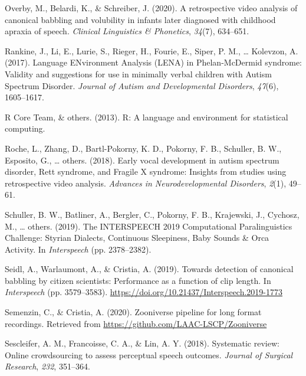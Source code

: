 \documentclass[english,,man]{apa6}
\begin{document}
\leavevmode\hypertarget{ref-overby2020retrospective}{}%
Overby, M., Belardi, K., \& Schreiber, J. (2020). A retrospective video analysis of canonical babbling and volubility in infants later diagnosed with childhood apraxia of speech. \emph{Clinical Linguistics \& Phonetics}, \emph{34}(7), 634--651.

\leavevmode\hypertarget{ref-rankine2017language}{}%
Rankine, J., Li, E., Lurie, S., Rieger, H., Fourie, E., Siper, P. M., \ldots{} Kolevzon, A. (2017). Language ENvironment Analysis (LENA) in Phelan-McDermid syndrome: Validity and suggestions for use in minimally verbal children with Autism Spectrum Disorder. \emph{Journal of Autism and Developmental Disorders}, \emph{47}(6), 1605--1617.

\leavevmode\hypertarget{ref-team2013r}{}%
R Core Team, \& others. (2013). R: A language and environment for statistical computing.

\leavevmode\hypertarget{ref-roche2018early}{}%
Roche, L., Zhang, D., Bartl-Pokorny, K. D., Pokorny, F. B., Schuller, B. W., Esposito, G., \ldots{} others. (2018). Early vocal development in autism spectrum disorder, Rett syndrome, and Fragile X syndrome: Insights from studies using retrospective video analysis. \emph{Advances in Neurodevelopmental Disorders}, \emph{2}(1), 49--61.

\leavevmode\hypertarget{ref-schuller2019interspeech}{}%
Schuller, B. W., Batliner, A., Bergler, C., Pokorny, F. B., Krajewski, J., Cychosz, M., \ldots{} others. (2019). The INTERSPEECH 2019 Computational Paralinguistics Challenge: Styrian Dialects, Continuous Sleepiness, Baby Sounds \& Orca Activity. In \emph{Interspeech} (pp. 2378--2382).

\leavevmode\hypertarget{ref-Seidl19}{}%
Seidl, A., Warlaumont, A., \& Cristia, A. (2019). Towards detection of canonical babbling by citizen scientists: Performance as a function of clip length. In \emph{Interspeech} (pp. 3579--3583). \url{https://doi.org/10.21437/Interspeech.2019-1773}

\leavevmode\hypertarget{ref-semenzin2020zooniverse}{}%
Semenzin, C., \& Cristia, A. (2020). Zooniverse pipeline for long format recordings. Retrieved from \url{https://github.com/LAAC-LSCP/Zooniverse}

\leavevmode\hypertarget{ref-sescleifer2018systematic}{}%
Sescleifer, A. M., Francoisse, C. A., \& Lin, A. Y. (2018). Systematic review: Online crowdsourcing to assess perceptual speech outcomes. \emph{Journal of Surgical Research}, \emph{232}, 351--364.
\end{document}
